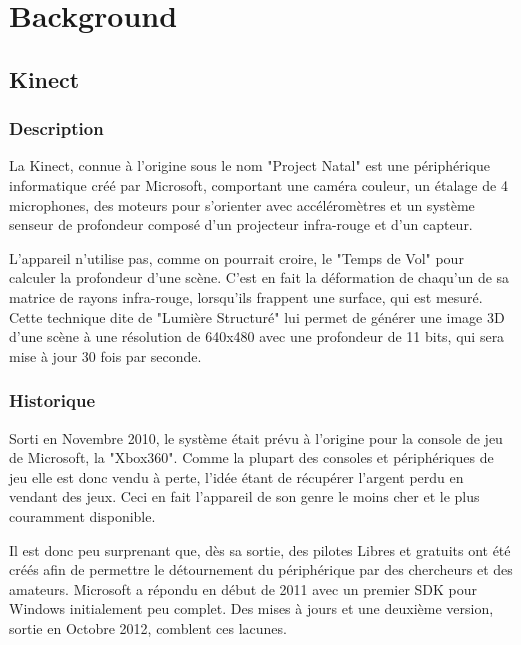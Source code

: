 \documentclass[french,12pt]{report}
\begin{document}

	\chapter{Background}
		\section{Kinect}

			\subsection{Description}
La Kinect, connue à l'origine sous le nom "Project Natal" est une
périphérique informatique créé par Microsoft, comportant une caméra
couleur, un étalage de 4 microphones, des moteurs pour s'orienter avec 
accéléromètres 
et un système senseur de profondeur composé d'un 
projecteur infra-rouge et d'un capteur. 

L'appareil n'utilise pas, comme on pourrait croire, le "Temps de Vol" pour
calculer la profondeur d'une scène. C'est en fait la déformation de chaqu'un de 
sa matrice de rayons infra-rouge,
lorsqu'ils frappent une surface, qui est mesuré. Cette technique dite de 
"Lumière Structuré"
lui permet de générer une image 3D d'une scène à une résolution de 640x480 avec 
une profondeur de 11 bits, qui sera mise à jour 30 fois par seconde.

			\subsection{Historique}
Sorti en Novembre 2010, le système était prévu à l'origine pour la console
de jeu de Microsoft, la "Xbox360". Comme la plupart des consoles et
périphériques de jeu elle
est donc vendu à perte, l'idée étant de récupérer l'argent perdu en vendant
des jeux. Ceci en fait l'appareil de son genre le moins cher et le plus couramment
disponible.

Il est donc peu surprenant que, dès sa sortie, des pilotes Libres et gratuits
ont été créés afin de permettre le détournement du périphérique par des
chercheurs et des amateurs. Microsoft a répondu en début de 2011 avec un
premier SDK pour Windows initialement peu complet. Des mises à jours et une
deuxième version, sortie en Octobre 2012, comblent ces lacunes.

		
\end{document}
